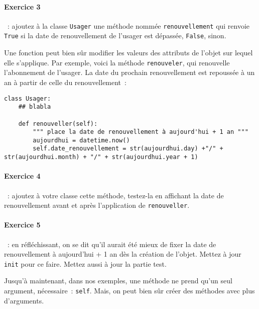 \documentclass{article}
\begin{document}
\paragraph{Exercice 3}~: ajoutez à la classe \texttt{Usager} une méthode nommée \texttt{renouvellement} qui renvoie \texttt{True} si la date de renouvellement de l'usager est dépassée, \texttt{False}, sinon.

Une fonction peut bien sûr modifier les valeurs des attributs de l'objet sur lequel elle s'applique. Par exemple, voici la méthode \texttt{renouveler}, qui renouvelle l'abonnement de l'usager. La date du prochain renouvellement est repoussée à un an à partir de celle du renouvellement~: 

\begin{verbatim}
class Usager:
    ## blabla
    
    def renouveller(self):
        """ place la date de renouvellement à aujourd'hui + 1 an """
        aujourdhui = datetime.now()
        self.date_renouvellement = str(aujourdhui.day) +"/" + str(aujourdhui.month) + "/" + str(aujourdhui.year + 1)
\end{verbatim}

\paragraph{Exercice 4}~: ajoutez à votre classe cette méthode, testez-la en affichant la date de renouvellement avant et après  l'application de \texttt{renouveller}.

\paragraph{Exercice 5}~: en réfléchissant, on se dit qu'il aurait été mieux de fixer la date de renouvellement à aujourd'hui + 1 an dès la création de l'objet. Mettez à jour \texttt{init} pour ce faire. Mettez aussi à jour la partie test.

Jusqu'à maintenant, dans nos exemples, une méthode ne prend qu'un seul argument, nécessaire~: \texttt{self}. Mais, on peut bien sûr créer des méthodes avec plus d'arguments.

  
\end{document}

